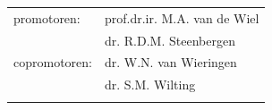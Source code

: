 \documentclass[notitlepage,twoside,10pt,openright,leqno]{Classes/PhDThesisPSnPDF} %
\begin{document}
\newpage
\thispagestyle{empty}

\newpage
\thispagestyle{empty}
\begin{tabular}{ll}
promotoren: & prof.dr.ir. M.A. van de Wiel\\
 & dr. R.D.M. Steenbergen \\
copromotoren: & dr. W.N. van Wieringen\\
 & dr. S.M. Wilting \\
\\ 
\end{tabular}

%
%
%
%
%


%

\tableofcontents



%

\mainmatter







%
%
%
%
%



\begin{spacing}{0.9}



\cleardoublepage







%

\end{spacing}
\end{document}
